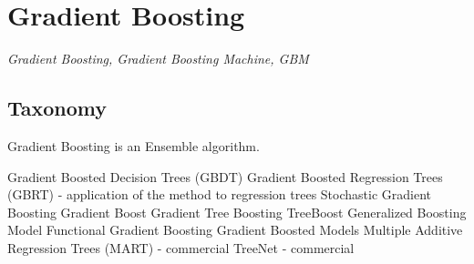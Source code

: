 
\section{Gradient Boosting} 
\label{sec:gradientboosting}

\emph{Gradient Boosting, Gradient Boosting Machine, GBM}

\subsection{Taxonomy}
Gradient Boosting is an Ensemble algorithm.

Gradient Boosted Decision Trees (GBDT)
Gradient Boosted Regression Trees (GBRT) - application of the method to regression trees
Stochastic Gradient Boosting
Gradient Boost
Gradient Tree Boosting
TreeBoost
Generalized Boosting Model
Functional Gradient Boosting
Gradient Boosted Models
Multiple Additive Regression Trees (MART) - commercial
TreeNet - commercial


